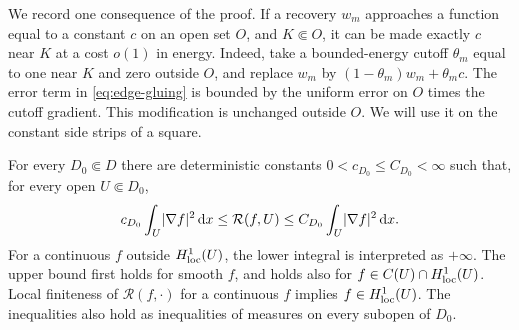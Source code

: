 We record one consequence of the proof.  If a recovery \(w_m\) approaches
a function equal to a constant \(c\) on an open set \(O\), and
\(K\Subset O\), it can be made exactly \(c\) near \(K\) at a cost \(o(1)\)
in energy.  Indeed, take a bounded-energy cutoff \(\theta_m\) equal to
one near \(K\) and zero outside \(O\), and replace \(w_m\) by
\((1-\theta_m)w_m+\theta_m c\).  The error term in
\eqref{eq:edge-gluing} is bounded by the uniform error on \(O\) times
the cutoff gradient.  This modification is unchanged outside \(O\).
We will use it on the constant side strips of a square.

\begin{lemma}\label{lem:energy-bounds}
For every \(D_0\Subset D\) there are deterministic constants
\(0<c_{D_0}\le C_{D_0}<\infty\) such that, for every open
\(U\Subset D_0\),
\begin{equation}\label{eq:energy-comparison}
 c_{D_0}\int_U\lvert \nabla f\rvert^2\,\mathrm d x
 \le \mathcal R(f,U)
 \le C_{D_0}\int_U\lvert \nabla f\rvert^2\,\mathrm d x.
\end{equation}
For a continuous \(f\) outside \(H^1_{\rm loc}(U)\), the lower integral
is interpreted as \(+\infty\).  The upper bound first holds for smooth
\(f\), and holds also for
\(f\in C(U)\cap H^1_{\rm loc}(U)\).  Local finiteness of
\(\mathcal R(f,\cdot)\) for a continuous \(f\) implies
\(f\in H^1_{\rm loc}(U)\).  The inequalities also hold as inequalities
of measures on every subopen of \(D_0\).
\end{lemma}


